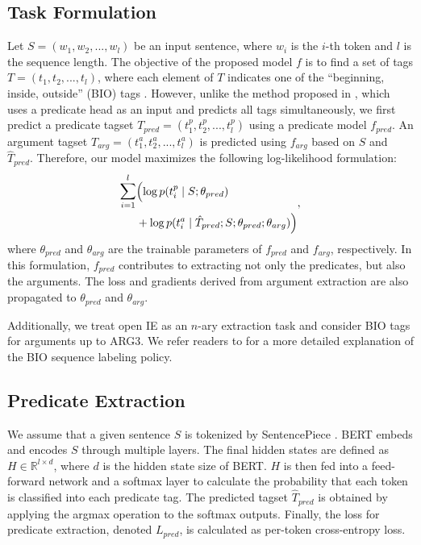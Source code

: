\documentclass[11pt,a4paper]{article}
\begin{document}
\subsection{Task Formulation}
\label{sec:task_formulation}
Let $S=(w_1, w_2, ..., w_l)$ be an input sentence, where $w_i$ is the $i$-th token and $l$ is the sequence length.
The objective of the proposed model $f$ is to find a set of tags $T=(t_1, t_2, ..., t_l)$, where each element of $T$ indicates one of the “beginning, inside, outside” (BIO) tags \citep{ramshaw-marcus-1995-text}.
However, unlike the method proposed in \citet{stanovsky-etal-2018-supervised}, which uses a predicate head as an input and predicts all tags simultaneously, we first predict a predicate tagset $T_{pred}=(t^p_1, t^p_2, ..., t^p_l)$ using a predicate model $f_{pred}$.
An argument tagset $T_{arg}=(t^a_1, t^a_2, ..., t^a_l)$ is predicted using $f_{arg}$ based on $S$ and $\hat{T}_{pred}$.
Therefore, our model maximizes the following log-likelihood formulation:
\begin{equation} 
\label{eq:1}
\begin{split}
   \mathlarger{\sum}_{i=1}^{l}
   & \Big({\log{p(t^p_i \mid S;\theta_{pred})}} \\
   & + {\log{p(t^a_i \mid \hat{T}_{pred};S;\theta_{pred};\theta_{arg})}}\Big)
\end{split},
\end{equation}
where $\theta_{pred}$ and $\theta_{arg}$ are the trainable parameters of $f_{pred}$ and $f_{arg}$, respectively.
In this formulation, $f_{pred}$ contributes to extracting not only the predicates, but also the arguments.
The loss and gradients derived from argument extraction are also propagated to $\theta_{pred}$ and $\theta_{arg}$.

Additionally, we treat open IE as an $n$-ary extraction task and consider BIO tags for arguments up to ARG3. We refer readers to \citet{stanovsky-etal-2018-supervised} for a more detailed explanation of the BIO sequence labeling policy.

\subsection{Predicate Extraction}
\label{sec:predicate_extraction}
We assume that a given sentence $S$ is tokenized by SentencePiece \citep{kudo-richardson-2018-sentencepiece}.
BERT embeds and encodes $S$ through multiple layers. The final hidden states are defined as $H\in\mathbb{R}^{l \times d}$, where $d$ is the hidden state size of BERT.
$H$ is then fed into a feed-forward network and a softmax layer to calculate the probability that each token is classified into each predicate tag.
The predicted tagset $\hat{T}_{pred}$ is obtained by applying the argmax operation to the softmax outputs.
Finally, the loss for predicate extraction, denoted $L_{pred}$, is calculated as per-token cross-entropy loss.
\end{document}
